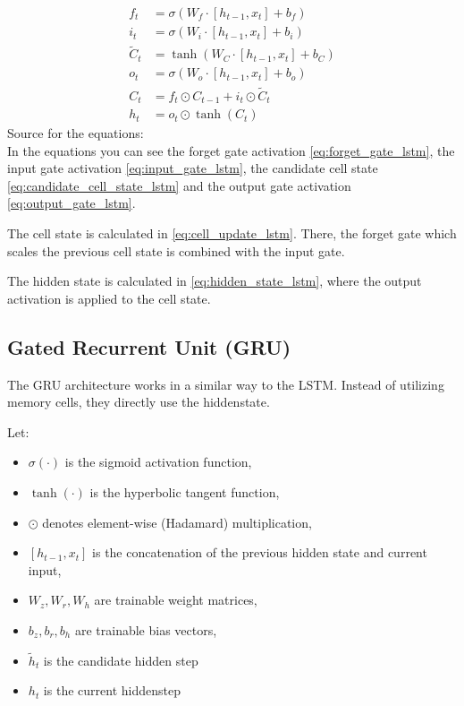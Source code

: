 \documentclass{article}
\begin{document}
\begin{align}
    f_t &= \sigma\!\left(W_f \cdot [h_{t-1}, x_t] + b_f\right) \label{eq:forget_gate_lstm} \\
    i_t &= \sigma\!\left(W_i \cdot [h_{t-1}, x_t] + b_i\right) \label{eq:input_gate_lstm} \\
    \tilde{C}_t &= \tanh\!\left(W_C \cdot [h_{t-1}, x_t] + b_C\right) \label{eq:candidate_cell_state_lstm} \\
    o_t &= \sigma\!\left(W_o \cdot [h_{t-1}, x_t] + b_o\right) \label{eq:output_gate_lstm}\\    
    C_t &= f_t \odot C_{t-1} + i_t \odot \tilde{C}_t \label{eq:cell_update_lstm}\\
    h_t &= o_t \odot \tanh(C_t) \label{eq:hidden_state_lstm}
\end{align}
Source for the equations: \cite{geeksforgeeks_lstm}
\\[2em]
In the equations you can see the forget gate activation \eqref{eq:forget_gate_lstm}, 
the input gate activation \eqref{eq:input_gate_lstm}, the candidate cell state 
\eqref{eq:candidate_cell_state_lstm} and the output gate activation \eqref{eq:output_gate_lstm}.

The cell state is calculated in \eqref{eq:cell_update_lstm}. There, the forget 
gate which scales the previous cell state is combined with the input gate.

The hidden state is calculated in \eqref{eq:hidden_state_lstm}, where the output 
activation is applied to the cell state.

\subsection{Gated Recurrent Unit (GRU)}

The GRU architecture works in a similar way to the LSTM. Instead of utilizing 
memory cells, they directly use the hiddenstate.

Let:
\begin{itemize}
    \item $\sigma(\cdot)$ is the sigmoid activation function,
    \item $\tanh(\cdot)$ is the hyperbolic tangent function,
    \item $\odot$ denotes element-wise (Hadamard) multiplication,
    \item $[h_{t-1}, x_t]$ is the concatenation of the previous hidden state and current input,
    \item $W_z, W_r, W_h$ are trainable weight matrices,
    \item $b_z, b_r, b_h$ are trainable bias vectors,
    \item $\tilde{h}_t$ is the candidate hidden step
    \item $h_t$ is the current hiddenstep
\end{itemize}
\end{document}
